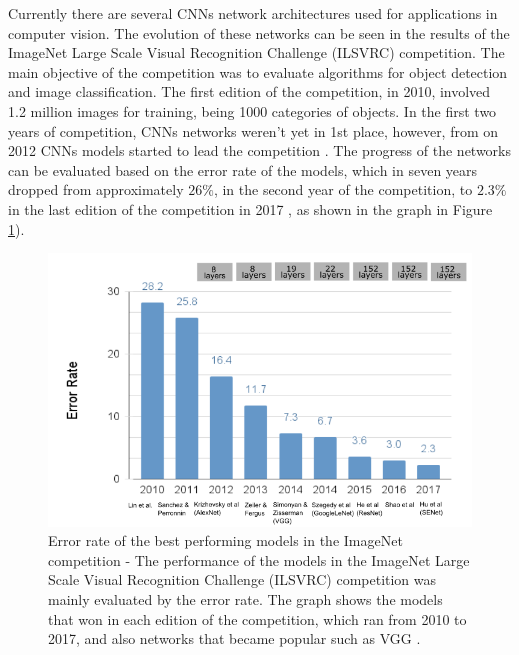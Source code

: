 Currently there are several CNNs network architectures used for applications in computer vision. The evolution of these networks can be seen in the results of the ImageNet Large Scale Visual Recognition Challenge (ILSVRC) competition. The main objective of the competition was to evaluate algorithms for object detection and image classification. The first edition of the competition, in 2010, involved 1.2 million images for training, being 1000 categories of objects. In the first two years of competition, CNNs networks weren't yet in 1st place, however, from on 2012 CNNs models started to lead the competition \cite{imagenet2020}. The progress of the networks can be evaluated based on the error rate of the models, which in seven years dropped from approximately $26\%$, in the second year of the competition, to $2.3\%$ in the last edition of the competition in 2017 \cite{johnson2019}, as shown in the graph in Figure \ref{fig:imagenet}).


\begin{figure}
    \centering
    \includegraphics[scale=0.4]{Part 3 - Learning Systems/Supervised Learning/Deep Learning/images/figure127.png}
    \caption{ Error rate of the best performing models in the ImageNet competition - The performance of the models in the ImageNet Large Scale Visual Recognition Challenge (ILSVRC) competition was mainly evaluated by the error rate. The graph shows the models that won in each edition of the competition, which ran from 2010 to 2017, and also networks that became popular such as VGG \cite{johnson2019}.}
    \label{fig:imagenet}
\end{figure}

